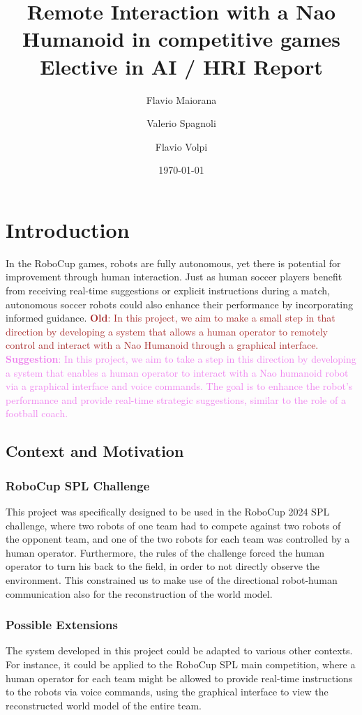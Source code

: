 \documentclass[a4paper, onecolumn, 12pt]{article}
\title{Remote Interaction with a Nao Humanoid in competitive games \\ Elective in AI / HRI Report}
\author{Flavio Maiorana \and Valerio Spagnoli \and Flavio Volpi}
\date{\today}
\newcommand\suggestion[1]{\textcolor{violet}{\textbf{Suggestion}: #1}}
\newcommand\old[1]{\textcolor{brown}{\textbf{Old}: #1}}
\begin{document}
\maketitle

\section{Introduction}
\label{sec:intro}
In the RoboCup games, robots are fully autonomous, yet there is potential for 
improvement through human interaction. Just as human soccer players benefit from 
receiving real-time suggestions or explicit instructions during a match, 
autonomous soccer robots could also enhance their performance by incorporating 
informed guidance. 
\old{In this project, we aim to make a small step in that direction by developing a 
system that allows a human operator to remotely control and interact with a Nao 
Humanoid through a graphical interface.}
\suggestion{In this project, we aim to take a step in this direction by developing a 
system that enables a human operator to interact with a Nao humanoid robot via a graphical 
interface and voice commands. The goal is to enhance the robot's performance and 
provide real-time strategic suggestions, similar to the role of a football coach.}

\subsection{Context and Motivation}
\label{sec:context}

\subsubsection{RoboCup SPL Challenge}
This project was specifically designed to be used in the RoboCup 2024 SPL challenge, 
where two robots of one team had to compete against two robots of the opponent team, 
and one of the two robots for each team was controlled by a human operator. Furthermore, 
the rules of the challenge forced the human operator to turn his back to the field, 
in order to not directly observe the environment. This constrained us to make use of the
directional robot-human communication also for the reconstruction of the world model.

\subsubsection{Possible Extensions}  
The system developed in this project could be adapted to various other contexts. For instance, 
it could be applied to the RoboCup SPL main competition, where a human operator for each team 
might be allowed to provide real-time instructions to the robots via voice commands, using the 
graphical interface to view the reconstructed world model of the entire team.  
\end{document}

